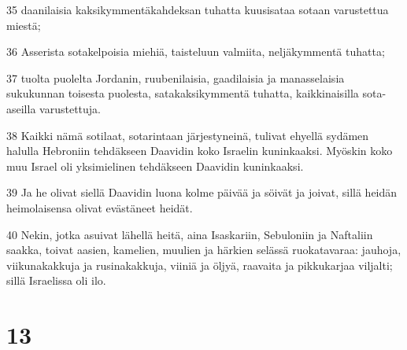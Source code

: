 \par 35 daanilaisia kaksikymmentäkahdeksan tuhatta kuusisataa sotaan varustettua miestä;
\par 36 Asserista sotakelpoisia miehiä, taisteluun valmiita, neljäkymmentä tuhatta;
\par 37 tuolta puolelta Jordanin, ruubenilaisia, gaadilaisia ja manasselaisia sukukunnan toisesta puolesta, satakaksikymmentä tuhatta, kaikkinaisilla sota-aseilla varustettuja.
\par 38 Kaikki nämä sotilaat, sotarintaan järjestyneinä, tulivat ehyellä sydämen halulla Hebroniin tehdäkseen Daavidin koko Israelin kuninkaaksi. Myöskin koko muu Israel oli yksimielinen tehdäkseen Daavidin kuninkaaksi.
\par 39 Ja he olivat siellä Daavidin luona kolme päivää ja söivät ja joivat, sillä heidän heimolaisensa olivat evästäneet heidät.
\par 40 Nekin, jotka asuivat lähellä heitä, aina Isaskariin, Sebuloniin ja Naftaliin saakka, toivat aasien, kamelien, muulien ja härkien selässä ruokatavaraa: jauhoja, viikunakakkuja ja rusinakakkuja, viiniä ja öljyä, raavaita ja pikkukarjaa viljalti; sillä Israelissa oli ilo.

\chapter{13}


